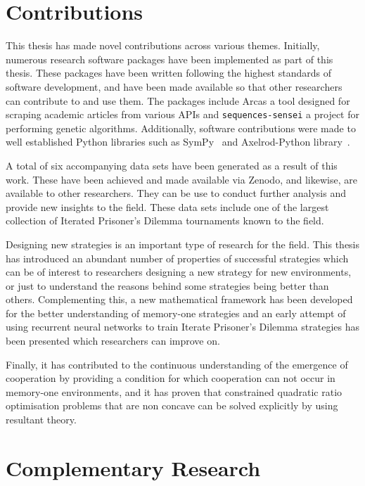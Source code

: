 \section{Contributions}

This thesis has made novel contributions across various themes. Initially, numerous
research software packages have been implemented as part of this thesis. These
packages have been written following the highest standards of software
development, and have been made available so that other researchers can
contribute to and use them. The packages include Arcas a tool designed for
scraping academic articles from various APIs and
\texttt{sequences-sensei} a project for performing genetic
algorithms. Additionally, software contributions were made to well established
Python libraries such as SymPy~\cite{sympy} and Axelrod-Python
library~\cite{axelrodproject}.

A total of six accompanying data sets have been generated as a result of this
work. These have been achieved and made available via Zenodo, and likewise, are
available to other researchers. They can be use to conduct further analysis and
provide new insights to the field. These data sets include one of the largest
collection of Iterated Prisoner's Dilemma tournaments known to the field.

Designing new strategies is an important type of research for the field.
This thesis has introduced an abundant number of properties of successful
strategies which can be of interest to researchers designing a new strategy
for new environments, or just to understand the reasons behind some strategies
being better than others. Complementing this, a new mathematical framework has
been developed for the better understanding of memory-one strategies and an
early attempt of using recurrent neural networks to train Iterate Prisoner's
Dilemma strategies has been presented which researchers can improve on.

Finally, it has contributed to the continuous understanding of the emergence of
cooperation by providing a condition for which cooperation can not occur in
memory-one environments, and it has proven that constrained quadratic
ratio optimisation problems that are non concave can be solved explicitly by
using resultant theory.

\section{Complementary Research}

